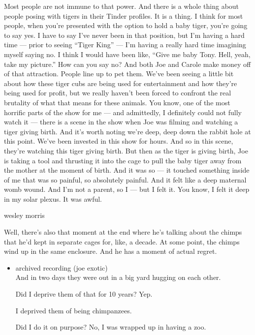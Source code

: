 Most people are not immune to that power. And there is a whole thing
about people posing with tigers in their Tinder profiles. It is a thing.
I think for most people, when you're presented with the option to hold a
baby tiger, you're going to say yes. I have to say I've never been in
that position, but I'm having a hard time --- prior to seeing ``Tiger
King'' --- I'm having a really hard time imagining myself saying no. I
think I would have been like, ``Give me baby Tony. Hell, yeah, take my
picture.'' How can you say no? And both Joe and Carole make money off of
that attraction. People line up to pet them. We've been seeing a little
bit about how these tiger cubs are being used for entertainment and how
they're being used for profit, but we really haven't been forced to
confront the real brutality of what that means for these animals. You
know, one of the most horrific parts of the show for me --- and
admittedly, I definitely could not fully watch it --- there is a scene
in the show when Joe was filming and watching a tiger giving birth. And
it's worth noting we're deep, deep down the rabbit hole at this point.
We've been invested in this show for hours. And so in this scene,
they're watching this tiger giving birth. But then as the tiger is
giving birth, Joe is taking a tool and thrusting it into the cage to
pull the baby tiger away from the mother at the moment of birth. And it
was so --- it touched something inside of me that was so painful, so
absolutely painful. And it felt like a deep maternal womb wound. And I'm
not a parent, so I --- but I felt it. You know, I felt it deep in my
solar plexus. It was awful.

wesley morris

Well, there's also that moment at the end where he's talking about the
chimps that he'd kept in separate cages for, like, a decade. At some
point, the chimps wind up in the same enclosure. And he has a moment of
actual regret.

\begin{itemize}
\item
  archived recording (joe exotic)\\
  And in two days they were out in a big yard hugging on each other.

  Did I deprive them of that for 10 years? Yep.

  I deprived them of being chimpanzees.

  Did I do it on purpose? No, I was wrapped up in having a zoo.
\end{itemize}

